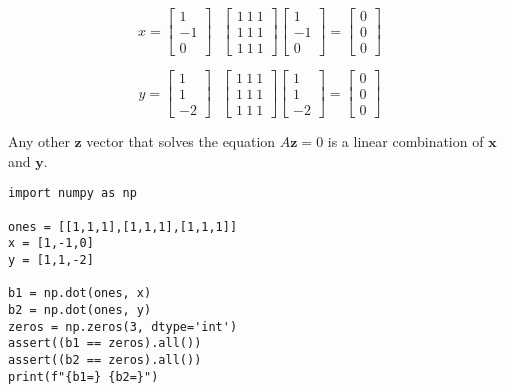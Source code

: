 \documentclass{article}
\newcommand{\vect}[1]{\ensuremath{\boldsymbol{#1}}}
\begin{document}
\begin{displaymath}
  x = \begin{bmatrix} 1 \\ -1 \\ 0 \end{bmatrix}
  ~~~
  \begin{bmatrix} 1 ~ 1 ~ 1 \\ 1 ~ 1 ~ 1 \\ 1 ~ 1 ~ 1 \end{bmatrix} \begin{bmatrix} 1 \\ -1 \\ 0 \end{bmatrix} = \begin{bmatrix} 0 \\ 0 \\ 0 \end{bmatrix}
\end{displaymath}

\begin{displaymath}
  y = \begin{bmatrix} 1 \\ 1 \\ -2 \end{bmatrix}
  ~~~
  \begin{bmatrix} 1 ~ 1 ~ 1 \\ 1 ~ 1 ~ 1 \\ 1 ~ 1 ~ 1 \end{bmatrix} \begin{bmatrix} 1 \\ 1 \\ -2 \end{bmatrix} = \begin{bmatrix} 0 \\ 0 \\ 0 \end{bmatrix}
\end{displaymath}

Any other $\vect{z}$ vector that solves the equation $A\vect{z}=0$ is a linear combination of $\vect{x}$ and $\vect{y}$.

\begin{verbatim}
import numpy as np

ones = [[1,1,1],[1,1,1],[1,1,1]]
x = [1,-1,0]
y = [1,1,-2]

b1 = np.dot(ones, x)
b2 = np.dot(ones, y)
zeros = np.zeros(3, dtype='int')
assert((b1 == zeros).all())
assert((b2 == zeros).all())
print(f"{b1=} {b2=}")
\end{verbatim}
\end{document}
